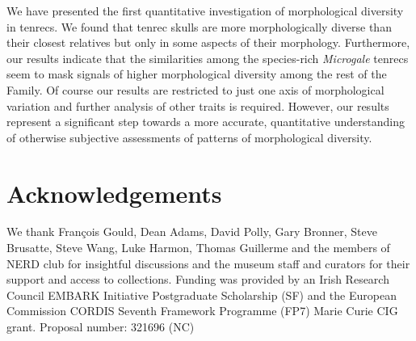 \documentclass[12pt,a4paper]{article}
\begin{document}
	We have presented the first quantitative investigation of morphological diversity in tenrecs. We found that tenrec skulls are more morphologically diverse than their closest relatives but only in some aspects of their morphology. Furthermore, our results indicate that the similarities among the species-rich \textit{Microgale} tenrecs seem to mask signals of higher morphological diversity among the rest of the Family. Of course our results are restricted to just one axis of morphological variation and further analysis of other traits is required. However, our results represent a significant step towards a more accurate, quantitative understanding of otherwise subjective assessments of patterns of morphological diversity. 


 
	
\section{Acknowledgements}

	We thank Fran\c{c}ois Gould, Dean Adams, David Polly, Gary Bronner, Steve Brusatte, Steve Wang, Luke Harmon, Thomas Guillerme and the members of NERD club for insightful discussions and the museum staff and curators for their support and access to collections. Funding was provided by an Irish Research Council EMBARK Initiative Postgraduate Scholarship (SF) and the European Commission CORDIS Seventh Framework Programme (FP7) Marie Curie CIG grant. Proposal number: 321696 (NC)





\end{document}
